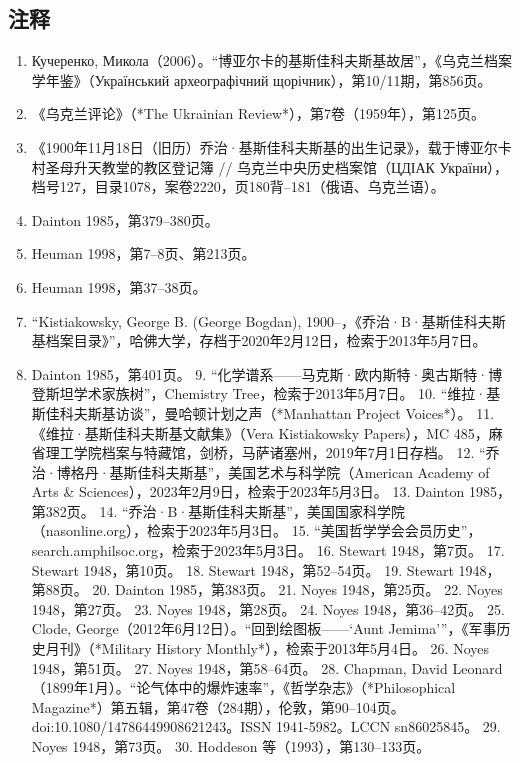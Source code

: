 \subsection{注释}
\begin{enumerate}
\item Кучеренко, Микола（2006）。“博亚尔卡的基斯佳科夫斯基故居”，《乌克兰档案学年鉴》（Український археографічний щорічник），第10/11期，第856页。
\item 《乌克兰评论》（*The Ukrainian Review*），第7卷（1959年），第125页。
\item 《1900年11月18日（旧历）乔治·基斯佳科夫斯基的出生记录》，载于博亚尔卡村圣母升天教堂的教区登记簿 // 乌克兰中央历史档案馆（ЦДІАК України），档号127，目录1078，案卷2220，页180背–181（俄语、乌克兰语）。
\item Dainton 1985，第379–380页。
\item Heuman 1998，第7–8页、第213页。
\item Heuman 1998，第37–38页。
\item “Kistiakowsky, George B. (George Bogdan), 1900–，《乔治·B·基斯佳科夫斯基档案目录》”，哈佛大学，存档于2020年2月12日，检索于2013年5月7日。
\item Dainton 1985，第401页。
9. “化学谱系——马克斯·欧内斯特·奥古斯特·博登斯坦学术家族树”，Chemistry Tree，检索于2013年5月7日。
10. “维拉·基斯佳科夫斯基访谈”，曼哈顿计划之声（*Manhattan Project Voices*）。
11. 《维拉·基斯佳科夫斯基文献集》（Vera Kistiakowsky Papers），MC 485，麻省理工学院档案与特藏馆，剑桥，马萨诸塞州，2019年7月1日存档。
12. “乔治·博格丹·基斯佳科夫斯基”，美国艺术与科学院（American Academy of Arts & Sciences），2023年2月9日，检索于2023年5月3日。
13. Dainton 1985，第382页。
14. “乔治·B·基斯佳科夫斯基”，美国国家科学院（nasonline.org），检索于2023年5月3日。
15. “美国哲学学会会员历史”，search.amphilsoc.org，检索于2023年5月3日。
16. Stewart 1948，第7页。
17. Stewart 1948，第10页。
18. Stewart 1948，第52–54页。
19. Stewart 1948，第88页。
20. Dainton 1985，第383页。
21. Noyes 1948，第25页。
22. Noyes 1948，第27页。
23. Noyes 1948，第28页。
24. Noyes 1948，第36–42页。
25. Clode, George（2012年6月12日）。“回到绘图板——‘Aunt Jemima’”，《军事历史月刊》（*Military History Monthly*），检索于2013年5月4日。
26. Noyes 1948，第51页。
27. Noyes 1948，第58–64页。
28. Chapman, David Leonard（1899年1月）。“论气体中的爆炸速率”，《哲学杂志》（*Philosophical Magazine*）第五辑，第47卷（284期），伦敦，第90–104页。doi:10.1080/14786449908621243。ISSN 1941-5982。LCCN sn86025845。
29. Noyes 1948，第73页。
30. Hoddeson 等（1993），第130–133页。

\end{enumerate}